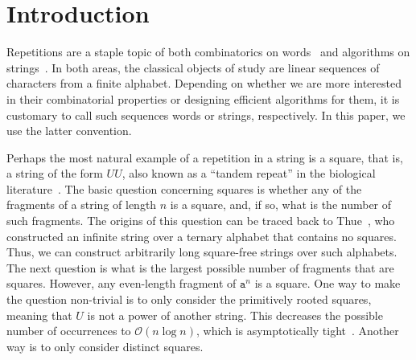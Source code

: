 \documentclass[11pt,letterpaper]{article}
\newcommand{\cO}{\mathcal{O}}
\begin{document}
\clearpage
\setcounter{page}{1}
\section{Introduction}
Repetitions are a staple topic of both combinatorics on words~\cite{BerstelP07} and algorithms on strings~\cite{AlgStrings}.
In both areas, the classical objects of study are linear sequences of characters from a finite alphabet.
Depending on whether we are more interested in their combinatorial properties or designing efficient algorithms for them,
it is customary to call such sequences words or strings, respectively. In this paper, we use the latter convention.

Perhaps the most natural example of a repetition in a string is a square, that is, a string of the form $UU$, also known as a ``tandem repeat'' in the biological literature~\cite{Gusfield1997}.
The basic question concerning squares is whether any of the fragments of a string of length $n$ is a square,
and, if so, what is the number of such fragments.
The origins of this question can be traced back to Thue~\cite{thue1906}, who
constructed an infinite string over a ternary alphabet that contains no squares.
Thus, we can construct arbitrarily long square-free strings over such alphabets.
The next question is what is the largest possible number of fragments that are squares.
However, any even-length fragment of $\texttt{a}^{n}$ is a square.
One way to make the question non-trivial is to only consider the primitively rooted squares,
meaning that $U$ is not a power of another string. This decreases the possible number of
occurrences to $\cO(n\log n)$, which is asymptotically tight~\cite{DBLP:journals/ipl/Crochemore81}.
Another way is to only consider distinct squares.
\end{document}
